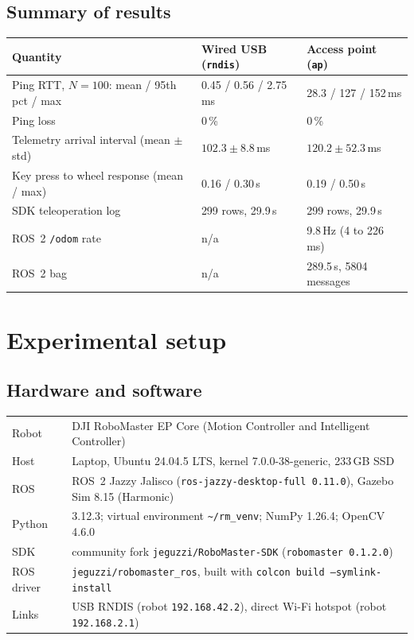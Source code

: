 \documentclass[11pt,a4paper]{article}
\begin{document}
\subsection*{Summary of results}
\begin{center}\small
\begin{tabular}{@{}p{7.1cm}p{4.2cm}p{4.2cm}@{}}
\toprule
\textbf{Quantity} & \textbf{Wired USB (\texttt{rndis})} & \textbf{Access point (\texttt{ap})}\\
\midrule
Ping RTT, $N=100$: mean / 95th pct / max & 0.45 / 0.56 / 2.75\,ms & 28.3 / 127 / 152\,ms\\
Ping loss & 0\,\% & 0\,\%\\
Telemetry arrival interval (mean $\pm$ std) & $102.3\pm8.8$\,ms & $120.2\pm52.3$\,ms\\
Key press to wheel response (mean / max) & 0.16 / 0.30\,s & 0.19 / 0.50\,s\\
SDK teleoperation log & 299 rows, 29.9\,s & 299 rows, 29.9\,s\\
ROS~2 \texttt{/odom} rate & n/a & 9.8\,Hz (4 to 226\,ms)\\
ROS~2 bag & n/a & 289.5\,s, 5804 messages\\
\bottomrule
\end{tabular}
\end{center}

\section{Experimental setup}
\subsection{Hardware and software}
\begin{center}\small
\begin{tabular}{@{}ll@{}}
\toprule
Robot & DJI RoboMaster EP Core (Motion Controller and Intelligent Controller)\\
Host & Laptop, Ubuntu 24.04.5 LTS, kernel 7.0.0-38-generic, 233\,GB SSD\\
ROS & ROS~2 Jazzy Jalisco (\texttt{ros-jazzy-desktop-full 0.11.0}), Gazebo Sim 8.15 (Harmonic)\\
Python & 3.12.3; virtual environment \texttt{\textasciitilde/rm\_venv}; NumPy 1.26.4; OpenCV 4.6.0\\
SDK & community fork \texttt{jeguzzi/RoboMaster-SDK} (\texttt{robomaster 0.1.2.0})\\
ROS driver & \texttt{jeguzzi/robomaster\_ros}, built with \texttt{colcon build --symlink-install}\\
Links & USB RNDIS (robot \texttt{192.168.42.2}), direct Wi-Fi hotspot (robot \texttt{192.168.2.1})\\
\bottomrule
\end{tabular}
\end{center}
\end{document}
